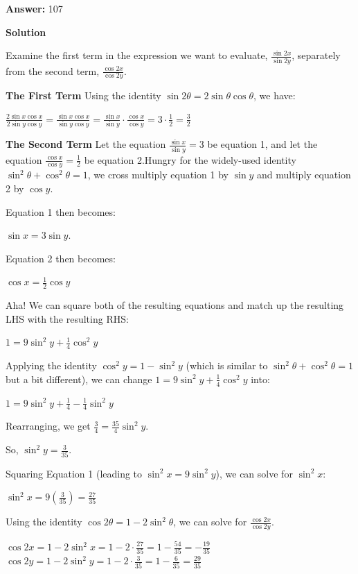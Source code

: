 \begin{enumerate}
 
 \textbf{Answer: }107



\textbf{Solution}

Examine the first term in the expression we want to evaluate, $\frac{\sin 2x}{\sin 2y}$, separately from the second term, $\frac{\cos 2x}{\cos 2y}$.

 \textbf{The First Term} Using the identity $\sin 2\theta = 2\sin\theta\cos\theta$, we have:

 $\frac{2\sin x \cos x}{2\sin y \cos y} = \frac{\sin x \cos x}{\sin y \cos y} = \frac{\sin x}{\sin y}\cdot\frac{\cos x}{\cos y}=3\cdot\frac{1}{2} = \frac{3}{2}$

 \textbf{The Second Term} Let the equation $\frac{\sin x}{\sin y} = 3$ be equation 1, and let the equation $\frac{\cos x}{\cos y} = \frac12$ be equation 2.Hungry for the widely-used identity $\sin^2\theta + \cos^2\theta = 1$, we cross multiply equation 1 by $\sin y$ and multiply equation 2 by $\cos y$.

 Equation 1 then becomes:

 $\sin x = 3\sin y$.

 Equation 2 then becomes:

 $\cos x = \frac{1}{2} \cos y$

 Aha! We can square both of the resulting equations and match up the resulting LHS with the resulting RHS:

 $1 = 9\sin^2 y + \frac{1}{4} \cos^2 y$

 Applying the identity $\cos^2 y = 1 - \sin^2 y$ (which is similar to $\sin^2\theta + \cos^2\theta = 1$ but a bit different), we can change $1 = 9\sin^2 y + \frac{1}{4} \cos^2 y$ into:

 $1 = 9\sin^2 y + \frac{1}{4} - \frac{1}{4} \sin^2 y$

 Rearranging, we get $\frac{3}{4} = \frac{35}{4} \sin^2 y$.

 So, $\sin^2 y = \frac{3}{35}$.

 Squaring Equation 1 (leading to $\sin^2 x = 9\sin^2 y$), we can solve for $\sin^2 x$:

 $\sin^2 x = 9\left(\frac{3}{35}\right) = \frac{27}{35}$

 Using the identity $\cos 2\theta = 1 - 2\sin^2\theta$, we can solve for $\frac{\cos 2x}{\cos 2y}$.

 $\cos 2x = 1 - 2\sin^2 x = 1 - 2\cdot\frac{27}{35} = 1 - \frac{54}{35} = -\frac{19}{35}$
$\cos 2y = 1 - 2\sin^2 y = 1 - 2\cdot\frac{3}{35} = 1 - \frac{6}{35} = \frac{29}{35}$


\end{enumerate}
